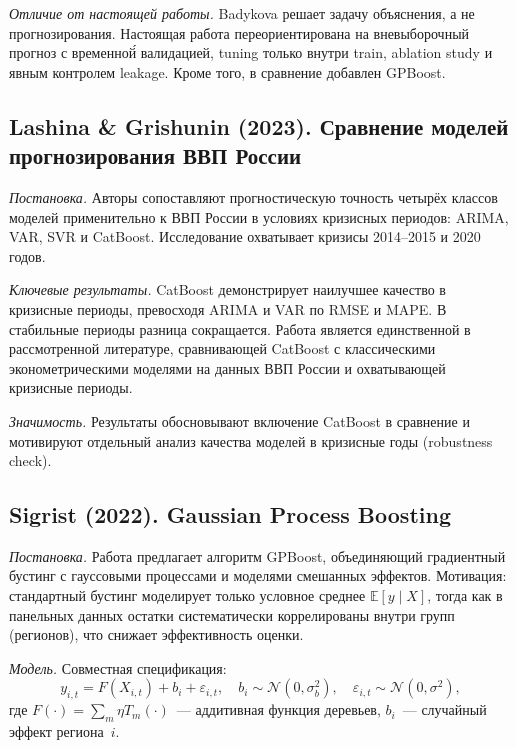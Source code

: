 \documentclass[12pt,a4paper]{article}
\begin{document}
\textit{Отличие от настоящей работы.} Badykova решает задачу объяснения,
а не прогнозирования. Настоящая работа переориентирована на вневыборочный
прогноз с временно\'{й} валидацией, tuning только внутри train, ablation
study и явным контролем leakage. Кроме того, в сравнение добавлен GPBoost.

\subsection{Lashina \& Grishunin (2023). Сравнение моделей
прогнозирования ВВП России~\cite{lashina2023}}

\textit{Постановка.} Авторы сопоставляют прогностическую точность четырёх
классов моделей применительно к ВВП России в условиях кризисных периодов:
ARIMA, VAR, SVR и CatBoost. Исследование охватывает кризисы 2014--2015
и 2020 годов.

\textit{Ключевые результаты.} CatBoost демонстрирует наилучшее качество
в кризисные периоды, превосходя ARIMA и VAR по RMSE и MAPE. В стабильные
периоды разница сокращается. Работа является единственной в рассмотренной
литературе, сравнивающей CatBoost с классическими эконометрическими
моделями на данных ВВП России и охватывающей кризисные периоды.

\textit{Значимость.} Результаты обосновывают включение CatBoost в сравнение
и мотивируют отдельный анализ качества моделей в кризисные годы (robustness
check).

\subsection{Sigrist (2022). Gaussian Process Boosting~\cite{sigrist2022}}

\textit{Постановка.} Работа предлагает алгоритм GPBoost, объединяющий
градиентный бустинг с гауссовыми процессами и моделями смешанных эффектов.
Мотивация: стандартный бустинг моделирует только условное среднее
$\mathbb{E}[y \mid X]$, тогда как в панельных данных остатки систематически
коррелированы внутри групп (регионов), что снижает эффективность оценки.

\textit{Модель.} Совместная спецификация:
\begin{equation}
  y_{i,t} = F(X_{i,t}) + b_i + \varepsilon_{i,t},
  \quad b_i \sim \mathcal{N}(0,\sigma_b^2),
  \quad \varepsilon_{i,t} \sim \mathcal{N}(0,\sigma^2),
\end{equation}
где $F(\cdot) = \sum_m \eta T_m(\cdot)$~--- аддитивная функция деревьев,
$b_i$~--- случайный эффект региона~$i$.
\end{document}
